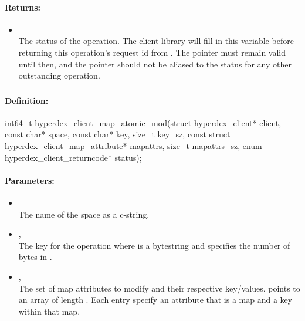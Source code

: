 \paragraph{Returns:}
\begin{itemize}[noitemsep]
\item {}\\
The status of the operation.  The client library will fill in this variable before returning this operation's request id from .  The pointer must remain valid until then, and the pointer should not be aliased to the status for any other outstanding operation.
\end{itemize}

\pagebreak
\subsubsection{}
\label{api:c:map_atomic_mod}


\paragraph{Definition:}
\begin{ccode}
int64_t hyperdex_client_map_atomic_mod(struct hyperdex_client* client,
        const char* space,
        const char* key, size_t key_sz,
        const struct hyperdex_client_map_attribute* mapattrs, size_t mapattrs_sz,
        enum hyperdex_client_returncode* status);
\end{ccode}

\paragraph{Parameters:}
\begin{itemize}[noitemsep]
\item {}\\
The name of the space as a c-string.
\item {}, \\
The key for the operation where  is a bytestring and  specifies the number of bytes in .
\item {}, \\
The set of map attributes to modify and their respective key/values.   points to an array of length .  Each entry specify an attribute that is a map and a key within that map.
\end{itemize}

